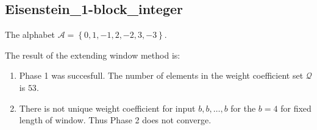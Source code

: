 \subsection{ Eisenstein\_1-block\_integer }

\label{subsec:Eisenstein1-blockinteger}

The alphabet $\mathcal{A} =\left\{0, 1, -1, 2, -2, 3, -3\right\}$.

\noindent The result of the extending window method is:
\begin{enumerate}
    \item Phase 1 was succesfull.
The number of elements in the weight coefficient set $\mathcal{Q}$ is $53$.

    \item There is not unique weight coefficient for input $b,b,\dots,b$ for the $b= 4 $ for fixed length of window. Thus Phase 2 does not converge.

\end{enumerate}

